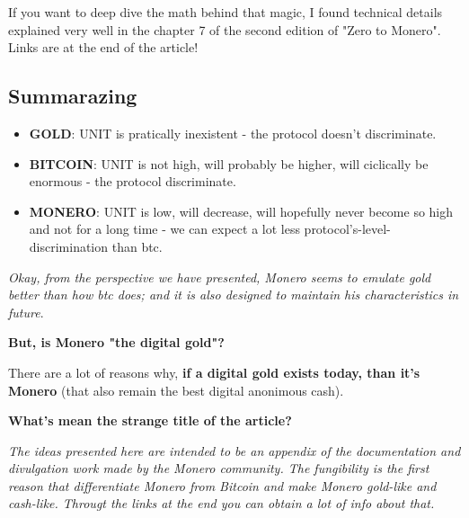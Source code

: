 \documentclass{article}
\begin{document}
If you want to deep dive the math behind that magic, I found technical details explained very well in the chapter 7 of the second edition of "Zero to Monero". Links are at the end of the article!\vspace{0.3cm}

\subsection{Summarazing}


\begin{itemize}

	\item \textbf{GOLD}: UNIT is pratically inexistent - the protocol doesn't discriminate.


	\item \textbf{BITCOIN}: UNIT is not high, will probably be higher, will ciclically be enormous - the protocol discriminate.


	\item \textbf{MONERO}: UNIT is low, will decrease, will hopefully never become so high and not for a long time - we can expect a lot less protocol's-level-discrimination than btc.\vspace{0.2cm}

\end{itemize}


\emph{Okay, from the perspective we have presented, Monero seems to emulate gold better than how btc does; and it is also designed to maintain his characteristics in future}.\vspace{0.2cm}

\textbf{But, is Monero "the digital gold"?}\vspace{0.2cm}


There are a lot of reasons why, \textbf{if a digital gold exists today, than it's Monero} (that also remain the best digital anonimous cash).\vspace{0.4cm}


\textbf{What's mean the strange title of the article?}

\emph{The ideas presented here are intended to be an appendix of the documentation and divulgation work made by the Monero community. The fungibility is the first reason that differentiate Monero from Bitcoin and make Monero gold-like and cash-like. Througt the links at the end you can obtain a lot of info about that.}\vspace{0.2cm}
\end{document}
